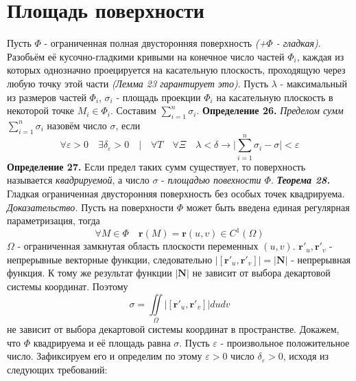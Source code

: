 \documentclass[12pt,a4paper]{article}
\begin{document}
	\section{Площадь поверхности}
	Пусть $\Phi$ - ограниченная полная двусторонняя поверхность \textit{(+$\Phi$ - гладкая)}. Разобьём её кусочно-гладкими кривыми на конечное число частей $\Phi_{i}$, каждая из которых однозначно проецируется на касательную плоскость, проходящую через любую точку этой части \textit{(Лемма 23 гарантирует это)}. Пусть $\lambda$ - максимальный из размеров частей $\Phi_{i}$, $\sigma_{i}$ - площадь проекции $\Phi_{i}$ на касательную плоскость в некоторой точке $M_{i} \in \Phi_{i}$. Составим $\sum\limits_{i=1}^n \sigma_{i}$.
	\newline
	\textbf{Определение 26.} \textit{Пределом сумм} $\sum\limits_{i=1}^n \sigma_{i}$ назовём число $\sigma$, если
	\[ \forall\varepsilon > 0 \quad \exists\delta_{\varepsilon} > 0 \quad | \quad \forall T \quad \forall \Xi \quad\lambda < \delta \rightarrow |\sum\limits_{i=1}^n \sigma_{i} - \sigma| < \varepsilon \]
	\textbf{Определение 27.} Если предел таких сумм существует, то поверхность называется \textit{квадрируемой}, а число $\sigma$ - \textit{площадью повехности $\Phi$}.
	\newline
	\newline
	\textbf{\textit{Теорема 28.}} Гладкая ограниченная двусторонняя поверхность без особых точек квадрируема.
	\newline
	\newline
	\textit{Доказательство.}
	\newline
	Пусть на поверхности $\Phi$ может быть введена единая регулярная параметризация, тогда
	\[\forall M \in \Phi \quad \textbf{r}(M) = \textbf{r}(u,v) \in C^{1}(\Omega) \]
	$\Omega$ - ограниченная замкнутая область плоскости переменных $(u,v)$.
	\newline
	$\textbf{r}'_{u}, \textbf{r}'_{v}$ - непрерывные векторные функции, следовательно $|\left[ \textbf{r}'_{u}, \textbf{r}'_{v} \right] | = |\textbf{N}|$ - непрерывная функция. К тому же результат функции $|\textbf{N}|$ не зависит от выбора декартовой системы координат. Поэтому
	\[ \sigma = \iint\limits_{\Omega} | \left[ \textbf{r}'_{u}, \textbf{r}'_{v} \right] | dudv\]
	не зависит от выбора декартовой системы координат в пространстве.
	\newline
	\newline
	Докажем, что $\Phi$ квадрируема и её площадь равна $\sigma$. Пусть $\varepsilon$ - произвольное положительное число. Зафиксируем его и определим по этому $\varepsilon > 0$ число $\delta_{\varepsilon} > 0$, исходя из следующих требований:
\end{document}
